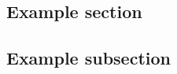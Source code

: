 \documentclass[10pt]{extarticle}
\begin{document}
\begin{multicols*}{2}

\setlength{\parskip}{0.0in}
\tableofcontents
\setlength{\parskip}{0.1in}

\section{Example section}

\subsection{Example subsection}


\end{multicols*}
\end{document}
